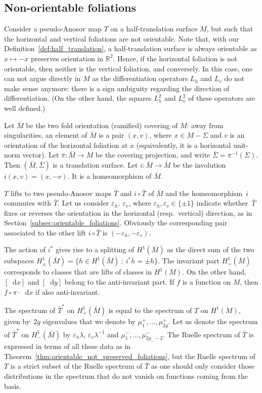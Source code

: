 \documentclass[JEP,XML,SOM,Unicode]{cedram}
\newcommand{\R}{\mathbb{R}}
\newcommand{\dd}{\mathop{}\!\mathrm{d}}
\newcommand{\st}{\::\:}
\let\epsilon\varepsilon
\theoremstyle{definition}
\numberwithin{equation}{section}
\begin{document}
\subsection{Non-orientable foliations}

Consider a pseudo-Anosov map $T$ on a half-translation surface $M$, but such
that the horizontal and vertical foliations are not orientable. Note that,
with our Definition~\ref{def:half_translation}, a half-translation surface is
always orientable as $x \mapsto -x$ preserves orientation in $\R^2$. Hence,
if the horizontal foliation is not orientable, then neither is the vertical
foliation, and conversely. In this case, one can not argue directly in $M$ as
the differentiation operators $L_h$ and $L_v$ do not make sense anymore:
there is a sign ambiguity regarding the direction of differentiation. (On the
other hand, the squares $L_h^2$ and $L_v^2$ of these operators are well
defined.)

Let $\bar M$ be the two fold orientation (ramified) covering of $M$: away
from singularities, an element of $\bar M$ is a pair $(x, v)$, where $x \in
M-\Sigma$ and $v$ is an orientation of the horizontal foliation at $x$
(equivalently, it is a horizontal unit-norm vector). Let $\bar \pi : \bar M
\to M$ be the covering projection, and write $\bar \Sigma = \bar
\pi^{-1}(\Sigma)$. Then $(\bar M, \bar \Sigma)$ is a translation surface.
Let $i: \bar M \to \bar M$ be the involution $i(x,v) = (x, -v)$. It is a
homeomorphism of $\bar M$.

$T$ lifts to two pseudo-Anosov maps $\bar T$ and $i\circ \bar T$ of $\bar M$ and
the homeomorphism~$i$ commutes with $\bar T$. Let us consider $\epsilon_h,\ \epsilon_v$, where $\epsilon_h, \epsilon_v \in \{\pm 1\}$ indicate whether~$\bar T$ fixes or reverses
the orientation in the horizontal (resp.\ vertical) direction, as in Section~\ref{subsec:orientable_foliations}.
Obviously the corresponding pair associated to the other lift $i\circ \bar T$ is $(-\epsilon_h,-\epsilon_v)$.

The action of $i^\ast$ gives rise to a splitting of $H^1(\bar M)$ as the
direct sum of the two subspaces $H^1_\pm(\bar M) = \{ h \in H^1(\bar M) \st
i^* h = \pm h\}$. The invariant part $H^1_+(\bar M)$ corresponds to classes
that are lifts of classes in $H^1(M)$. On the other hand, $[\dd x]$ and $[\dd
y]$ belong to the anti-invariant part. If $f$ is a function on $M$, then
$f\circ \pi \cdot \dd x$ if also anti-invariant.

The spectrum of $\bar T^*$ on $H^1_+(\bar M)$ is equal to the spectrum of $T$
on $H^1(M)$, given by~$2g$ eigenvalues that we denote by $\mu_1^+,\dotsc,
\mu_{2g}^+$. Let us denote the spectrum of $\bar T^*$ on $H^1_-(\bar M)$ by
$\epsilon_h \lambda$, $\epsilon_v \lambda^{-1}$ and $\mu_1^-,\dotsc,
\mu_{2g_- -2}^-$. The
Ruelle spectrum of $\bar T$ is expressed in terms of all these data as in
Theorem~\ref{thm:orientable_not_preserved_foliations}, but the Ruelle
spectrum of $T$ is a strict subset of the Ruelle spectrum of $\bar T$ as one
should only consider those distributions in the spectrum that do not vanish
on functions coming from the basis.
\end{document}
